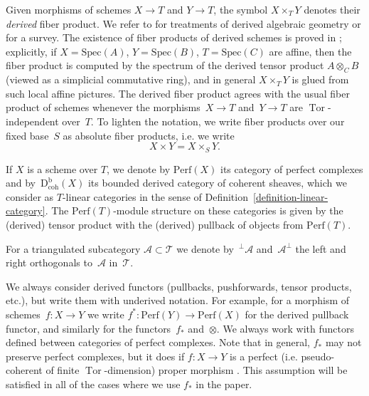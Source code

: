 \documentclass[11pt, reqno]{amsart}
\numberwithin{equation}{section}
\theoremstyle{plain}
\theoremstyle{definition}
\newcommand{\Perf}{\mathrm{Perf}}
\newcommand{\Db}{\mathrm{D^b_{coh}}}
\newcommand{\Spec}{\mathrm{Spec}}
\DeclareMathOperator{\Tor}{Tor}
\newcommand{\cA}{\mathcal{A}}
\newcommand{\cT}{\mathcal{T}}
\begin{document}
Given morphisms of schemes $X \to T$ and $Y \to T$, the symbol 
$X \times_T Y$ denotes their \emph{derived} fiber product. 
We refer to \cite{TV, lurie-SAG, gaitsgory-DAG} for treatments of derived algebraic geometry or \cite{toen-survey} for a survey. 
The existence of fiber products of derived schemes is proved in \cite[\S1.3.3]{TV}; 
explicitly, if $X = \Spec(A)$, $Y=\Spec(B)$, $T = \Spec(C)$ are affine, 
then the fiber product is computed by the spectrum of the derived tensor product $A \otimes_C B$ 
(viewed as a simplicial commutative ring), and in general $X \times_T Y$ is glued from such local affine pictures. 
The derived fiber product agrees with the usual fiber product of schemes whenever the 
morphisms~\mbox{$X \to T$} and~\mbox{$Y \to T$} are $\Tor$-independent over~$T$. 
To lighten the notation, we write fiber products over our fixed base~$S$ as absolute fiber products, i.e. we write 
\begin{equation*}
X \times Y = X \times_S Y. 
\end{equation*}

If $X$ is a scheme over $T$, we denote by $\Perf(X)$ its category of perfect complexes and 
by~$\Db(X)$ its bounded derived category of coherent sheaves, which we consider as $T$-linear 
categories in the sense of Definition~\ref{definition-linear-category}. 
The $\Perf(T)$-module structure on these categories is given by the (derived) tensor product 
with the (derived) pullback of objects from $\Perf(T)$. 

For a triangulated subcategory $\cA \subset \cT$ we denote by~${}^\perp\cA$ and~$\cA^\perp$ 
the left and right orthogonals to~$\cA$ in~$\cT$. 

We always consider derived functors (pullbacks, pushforwards, tensor products, etc.),  
but write them with underived notation. 
For example, for a morphism of schemes~$f \colon X \to Y$ 
we write $f^* \colon \Perf(Y) \to \Perf(X)$ for the derived pullback functor, and similarly for the functors~$f_*$ and~$\otimes$. 
We always work with functors defined between categories of perfect complexes. 
Note that in general, $f_*$ may not preserve perfect complexes, but it does if 
$f \colon X \to Y $ is a perfect (i.e. pseudo-coherent of finite $\Tor$-dimension) proper morphism \cite[Example 2.2(a)]{lipman}. 
This assumption will be satisfied in all of the cases where we use $f_*$ in the paper. 
\end{document}
